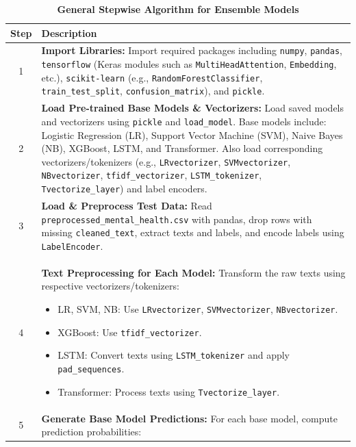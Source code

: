 \begin{table}[H]
    \caption*{\textbf{General Stepwise Algorithm for Ensemble Models}}
    \label{tab:ensemble_algorithm}
    \centering
    \renewcommand{\arraystretch}{1.3}
    \small
    \begin{tabularx}{\textwidth}{|c|X|}
        \hline
        \textbf{Step} & \textbf{Description} \\
        \hline
        1 & \textbf{Import Libraries:} Import required packages including \texttt{numpy}, \texttt{pandas}, \texttt{tensorflow} (Keras modules such as \texttt{MultiHeadAttention}, \texttt{Embedding}, etc.), \texttt{scikit-learn} (e.g., \texttt{RandomForestClassifier}, \texttt{train\_test\_split}, \texttt{confusion\_matrix}), and \texttt{pickle}. \\
        \hline
        2 & \textbf{Load Pre-trained Base Models \& Vectorizers:} Load saved models and vectorizers using \texttt{pickle} and \texttt{load\_model}. Base models include: Logistic Regression (LR), Support Vector Machine (SVM), Naive Bayes (NB), XGBoost, LSTM, and Transformer. Also load corresponding vectorizers/tokenizers (e.g., \texttt{LRvectorizer}, \texttt{SVMvectorizer}, \texttt{NBvectorizer}, \texttt{tfidf\_vectorizer}, \texttt{LSTM\_tokenizer}, \texttt{Tvectorize\_layer}) and label encoders. \\
        \hline
        3 & \textbf{Load \& Preprocess Test Data:} Read \texttt{preprocessed\_mental\_health.csv} with pandas, drop rows with missing \texttt{cleaned\_text}, extract texts and labels, and encode labels using \texttt{LabelEncoder}. \\
        \hline
        4 & \textbf{Text Preprocessing for Each Model:} Transform the raw texts using respective vectorizers/tokenizers:
              \begin{itemize}[noitemsep, topsep=0pt]
                  \item LR, SVM, NB: Use \texttt{LRvectorizer}, \texttt{SVMvectorizer}, \texttt{NBvectorizer}.
                  \item XGBoost: Use \texttt{tfidf\_vectorizer}.
                  \item LSTM: Convert texts using \texttt{LSTM\_tokenizer} and apply \texttt{pad\_sequences}.
                  \item Transformer: Process texts using \texttt{Tvectorize\_layer}.
              \end{itemize} \\
        \hline
        5 & \textbf{Generate Base Model Predictions:} For each base model, compute prediction probabilities:

\end{tabularx}
\end{table}
